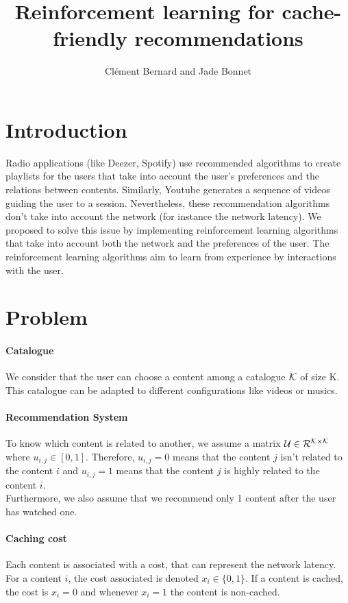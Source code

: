 \documentclass[a4paper]{article}
\title{Reinforcement learning for cache-friendly recommendations}
\author{Clément Bernard and Jade Bonnet }
\begin{document}
\maketitle

\begin{abstract}


\end{abstract}






\section{Introduction}

Radio applications (like Deezer, Spotify) use recommended algorithms to create playlists for the users that take into account the user's preferences and the relations between contents. Similarly, Youtube generates a sequence of videos guiding the user to a session. Nevertheless, these recommendation algorithms don't take into account the network (for instance the network latency).
We proposed to solve this issue by implementing reinforcement learning algorithms that take into account both the network and the preferences of the user. The reinforcement learning algorithms aim to learn from experience by interactions with the user. 


\section{Problem}

\paragraph{Catalogue} We consider that the user can choose a content among a catalogue $\cal{K}$ of size K. This catalogue can be adapted to different configurations like videos or musics. 
\paragraph{Recommendation System} To know which content is related to another, we assume a matrix $\cal{U} \in \cal{R}^{K \times K} $ where $u_{i,j} \in [0,1]$. Therefore, $u_{i,j} = 0$ means that the content $j$ isn't related to the content $i$ and $u_{i,j} = 1$ means that the content $j$ is highly related to the content $i$. \\
Furthermore, we also assume that we recommend only 1 content after the user has watched one.
\paragraph{Caching cost} Each content is associated with a cost, that can represent the network latency. For a content $i$, the cost associated is denoted $x_i \in \{0,1\}$. If a content is cached, the cost is $x_i = 0$ and whenever $x_i = 1$ the content is non-cached. 
\end{document}
